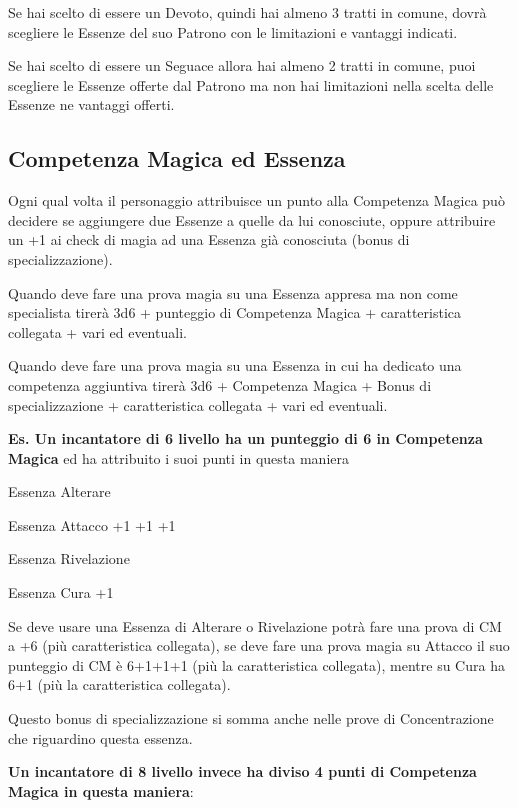 \documentclass[a4paper,11pt,twoside,openany]{book}
\begin{document}
Se hai scelto di essere un Devoto, quindi hai almeno 3 tratti in comune, dovrà scegliere le Essenze del suo Patrono con le limitazioni e vantaggi indicati.

Se hai scelto di essere un Seguace allora hai almeno 2 tratti in comune, puoi scegliere le Essenze offerte dal Patrono ma non hai limitazioni nella scelta delle Essenze ne vantaggi offerti.

\subsection{Competenza Magica ed Essenza}

\label{competenza-magica-ed-essenza}

Ogni qual volta il personaggio attribuisce un punto alla Competenza Magica può decidere se aggiungere due Essenze a quelle da lui conosciute, oppure attribuire un +1 ai check di magia ad una Essenza già conosciuta (bonus di specializzazione).

Quando deve fare una prova magia su una Essenza appresa ma non come specialista tirerà 3d6 + punteggio di Competenza Magica + caratteristica collegata + vari ed eventuali.

Quando deve fare una prova magia su una Essenza in cui ha dedicato una competenza aggiuntiva tirerà 3d6 + Competenza Magica + Bonus di specializzazione + caratteristica collegata + vari ed eventuali.

\bigskip

\textbf{Es. Un incantatore di 6 livello ha un punteggio di 6 in Competenza Magica} ed ha attribuito i suoi punti in questa maniera

Essenza Alterare

Essenza Attacco +1 +1 +1

Essenza Rivelazione

Essenza Cura +1

Se deve usare una Essenza di Alterare o Rivelazione potrà fare una prova di CM a +6 (più caratteristica collegata), se deve fare una prova magia su Attacco il suo punteggio di CM è 6+1+1+1 (più la caratteristica collegata), mentre su Cura ha 6+1 (più la caratteristica collegata).

Questo bonus di specializzazione si somma anche nelle prove di Concentrazione che riguardino questa essenza.

\bigskip

\textbf{Un incantatore di 8 livello invece ha diviso 4 punti di Competenza
Magica in questa maniera}:
\end{document}
